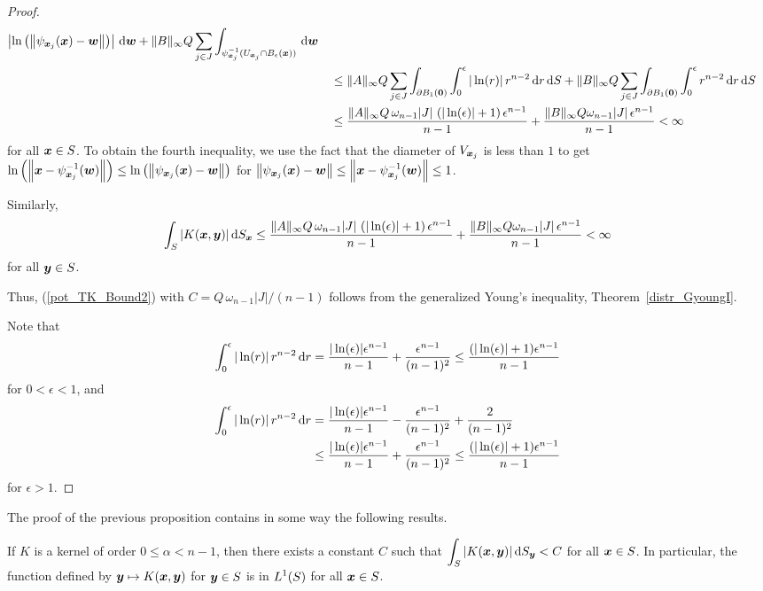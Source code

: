 \begin{proof}
\begin{align*}
\left| \ln\left(
\left\| \psi_{{\bm{x}}_j}({\bm{x}}) - {\bm{w}} \right\|\right) \right|
\,\mathrm{d}{{\bm{w}}}
+ \|B\|_\infty Q \sum_{j\in J}
\int_{\psi_{{\bm{x}}_j}^{-1}(U_{{\bm{x}}_j}\cap B_\epsilon({\bm{x}}))} \,\mathrm{d}{{\bm{w}}} \\
&\quad \leq \|A\|_\infty Q \sum_{j\in J} \int_{\partial B_1({\bm{0}})}
\int_0^{\epsilon} |\ln(r)| \,r^{n-2} \,\mathrm{d}{r} \,\mathrm{d}{S}
+ \|B\|_\infty Q \sum_{j\in J} \int_{\partial B_1({\bm{0}})}
\int_0^{\epsilon} r^{n-2} \,\mathrm{d}{r} \,\mathrm{d}{S} \\
&\quad \leq \frac{\|A\|_\infty Q\, \omega_{n-1}
|J|\,\left( |\ln(\epsilon)| + 1 \right) \epsilon^{n-1}}{n-1}
+ \frac{\|B\|_\infty Q \omega_{n-1} |J|\, \epsilon^{n-1}}{n-1}
< \infty
\end{align*}
for all ${\bm{x}} \in S$.  To obtain the fourth inequality, we use
the fact that the diameter of $V_{{\bm{x}}_j}$ is less than $1$ to get
$\displaystyle
\ln\left(\left\| {\bm{x}} - \psi_{{\bm{x}}_j}^{-1}({\bm{w}}) \right\|\right)
\leq \ln\left(\left\| \psi_{{\bm{x}}_j}({\bm{x}}) - {\bm{w}} \right\|\right)$
for
$\displaystyle 
\left\| \psi_{{\bm{x}}_j}({\bm{x}}) - {\bm{w}} \right\|
\leq \left\| {\bm{x}} - \psi_{{\bm{x}}_j}^{-1}({\bm{w}}) \right\| \leq  1$.

Similarly,
\[
\int_S | K({\bm{x}},{\bm{y}}) | \,\mathrm{d}{S}_{{\bm{x}}}
\leq \frac{\|A\|_\infty Q\, \omega_{n-1}
|J|\,\left( |\ln(\epsilon)| + 1 \right) \epsilon^{n-1}}{n-1}
+ \frac{\|B\|_\infty Q \omega_{n-1} |J|\, \epsilon^{n-1}}{n-1}
< \infty
\]
for all ${\bm{y}} \in S$.

Thus, (\ref{pot_TK_Bound2}) with $C= Q\, \omega_{n-1} |J|/(n-1)$
follows from the generalized Young's inequality,
Theorem~\ref{distr_GyoungI}.

Note that
\[
\int_0^{\epsilon} |\ln(r)| \,r^{n-2} \,\mathrm{d}{r} 
= \frac{|\ln(\epsilon)|\epsilon^{n-1}}{n-1} +
\frac{\epsilon^{n-1}}{(n-1)^2}
\leq \frac{(|\ln(\epsilon)| + 1)\epsilon^{n-1}}{n-1}
\]
for $0 < \epsilon < 1$, and
\begin{align*}
\int_0^{\epsilon} |\ln(r)| \,r^{n-2} \,\mathrm{d}{r} 
&= \frac{|\ln(\epsilon)|\epsilon^{n-1}}{n-1} -
\frac{\epsilon^{n-1}}{(n-1)^2} + \frac{2}{(n-1)^2} \\
&\leq \frac{|\ln(\epsilon)|\epsilon^{n-1}}{n-1}
+ \frac{\epsilon^{n-1}}{(n-1)^2}
\leq \frac{(|\ln(\epsilon)| + 1)\epsilon^{n-1}}{n-1}
\end{align*}
for $\epsilon >1$.
\end{proof}

The proof of the previous proposition contains in some way the
following results.

\begin{prop} \label{pot_prop_KL1}
If $K$ is a kernel of order $0 \leq \alpha < n-1$, then there exists a
constant $C$ such that
$\displaystyle \int_S |K({\bm{x}},{\bm{y}})| \,\mathrm{d}{S}_{{\bm{y}}} < C$
for all ${\bm{x}} \in S$.  In particular,  the function defined by
${\bm{y}} \mapsto K({\bm{x}},{\bm{y}})$ for ${\bm{y}} \in S$ 
is in $\displaystyle L^1(S)$ for all ${\bm{x}}\in S$.
\end{prop}

